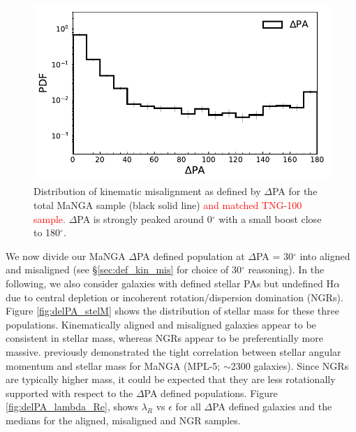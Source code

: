 \documentclass[fleqn,usenatbib]{mnras}
\newcommand{\red}[1]{{\textcolor{red}{#1}}}
\begin{document}
\begin{figure}
	\includegraphics[width=\linewidth]{total_pop/mpl8_pa_dist.pdf}
    \caption{Distribution of kinematic misalignment as defined by $\Delta$PA for the total MaNGA sample (black solid line) \red{and matched TNG-100 sample.} $\Delta$PA is strongly peaked around 0$^{\circ}$ with a small boost close to 180$^{\circ}$.}
    \label{fig:total_pa_dist}
\end{figure}

We now divide our MaNGA $\Delta$PA defined population at $\Delta$PA = 30$^{\circ}$ into aligned and misaligned (see \S\ref{sec:def_kin_mis} for choice of 30$^{\circ}$ reasoning). In the following, we also consider galaxies with defined stellar PAs but undefined H$\alpha$ due to central depletion or incoherent rotation/dispersion domination (NGRs). Figure \ref{fig:delPA_stelM} shows the distribution of stellar mass for these three populations. Kinematically aligned and misaligned galaxies appear to be consistent in stellar mass, whereas NGRs appear to be preferentially more massive. \citet{graham2018} previously demonstrated the tight correlation between stellar angular momentum and stellar mass for MaNGA (MPL-5; $\sim$2300 galaxies). Since NGRs are typically higher mass, it could be expected that they are less rotationally supported with respect to the $\Delta$PA defined populations. Figure \ref{fig:delPA_lambda_Re}, shows $\lambda_R$ vs $\epsilon$ for all $\Delta$PA defined galaxies and the medians for the aligned, misaligned and NGR samples. 
\end{document}
